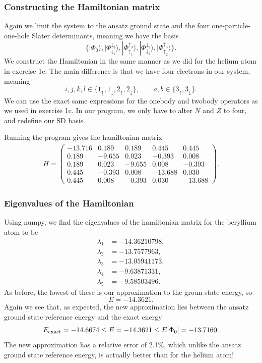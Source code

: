 \documentclass[a4paper, 11pt, notitlepage, english]{article}
\newcommand{\ket}[1]{|#1 \rangle}
\renewcommand{\d}{{\rm d}}
\renewcommand{\u}{\uparrow}
\renewcommand{\d}{\downarrow}
\newcommand{\ui}{{\u_1}}
\newcommand{\uii}{{\u_2}}
\newcommand{\uiii}{{\u_3}}
\newcommand{\di}{{\d_1}}
\newcommand{\dii}{{\d_2}}
\newcommand{\diii}{{\d_3}}
\begin{document}
\subsubsection*{Constructing the Hamiltonian matrix}
Again we limit the system to the ansatz ground state and the four one-particle-one-hole Slater determinants, meaning we have the basis
$$ \{ \ket{\Phi_0}, \ket{\Phi_\di^\diii}, \ket{\Phi_\ui^\uiii}, \ket{\Phi_\dii^\diii}, \ket{\Phi_\uii^\uiii} \}.$$
We construct the Hamiltonian in the same manner as we did for the helium atom in exercise 1c. The main difference is that we have four electrons in our system, meaning
$$i,j,k,l \in \{1_\u, 1_\d, 2_\u, 2_\d\}, \qquad a,b \in \{3_\u, 3_\d\}.$$
We can use the exact same expressions for the onebody and twobody operators as we used in exercise 1c. In our program, we only have to alter $N$ and $Z$ to four, and redefine our SD basis.

Running the program gives the hamiltonian matrix
\begin{align*}
H = \begin{pmatrix}
-13.716 &  0.189 &  0.189 &  0.445 &  0.445  \\
0.189 &  -9.655 &  0.023 &  -0.393 &  0.008  \\
0.189 &  0.023 &  -9.655 &  0.008 &  -0.393  \\
0.445 &  -0.393 &  0.008 &  -13.688 &  0.030  \\
0.445 &  0.008 &  -0.393 &  0.030 &  -13.688 	
\end{pmatrix}.
\end{align*}

\subsubsection*{Eigenvalues of the Hamiltonian}
Using numpy, we find the eigenvalues of the hamiltonian matrix for the beryllium atom to be
\begin{align*}
\lambda_1 &= -14.36210798, \\
\lambda_2 &= -13.7577963, \\
\lambda_3 &= -13.05941173, \\
\lambda_4 &= -9.63871331, \\
\lambda_5 &= -9.58503496. 
\end{align*}
As before, the lowest of these is our approximation to the groun state energy, so
$$E = -14.3621.$$
Again we see that, as expected, the new approximation lies between the ansatz ground state reference energy and the exact energy
$$E_{\rm exact} = -14.6674 \leq E = -14.3621 \leq E[\Phi_0] = -13.7160.$$ 
The new approximation has a relative error of 2.1\%, which unlike the ansatz ground state reference energy, is actually better than for the helium atom!
\end{document}
